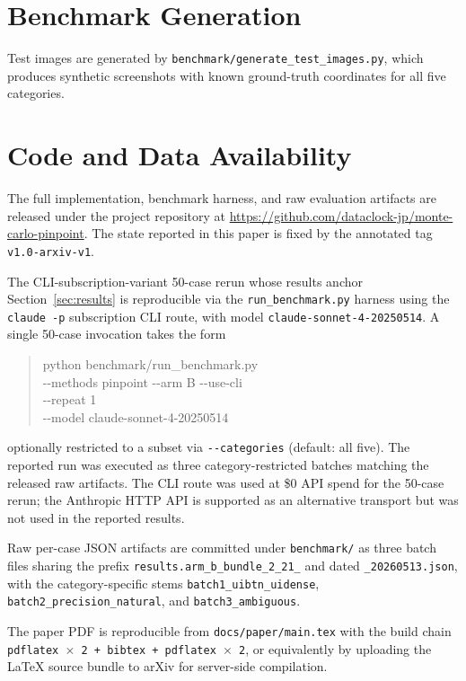 \documentclass[sigconf,nonacm]{acmart}
\begin{document}
\section{Benchmark Generation}

{\sloppy
Test images are generated by
\texttt{benchmark/generate\_test\_images.py},
which produces synthetic screenshots with known ground-truth coordinates
for all five categories.\par}

\section{Code and Data Availability}

{\sloppy
The full implementation, benchmark harness, and raw evaluation
artifacts are released under the project repository at
\url{https://github.com/dataclock-jp/monte-carlo-pinpoint}.  The
state reported in this paper is fixed by the annotated tag
\texttt{v1.0-arxiv-v1}.\par}

The CLI-subscription-variant 50-case rerun whose results anchor
Section~\ref{sec:results} is reproducible via the
\texttt{run\_benchmark.py} harness using the
\texttt{claude -p} subscription CLI route, with model
\texttt{claude-sonnet-4-20250514}.  A single 50-case invocation
takes the form
\begin{quote}\small\ttfamily
python benchmark/run\_benchmark.py\\
\hspace*{2em}-{}-methods pinpoint -{}-arm B -{}-use-cli\\
\hspace*{2em}-{}-repeat 1\\
\hspace*{2em}-{}-model claude-sonnet-4-20250514
\end{quote}
optionally restricted to a subset via
\texttt{-{}-categories} (default: all five).  The reported run
was executed as three category-restricted batches matching the
released raw artifacts.  The CLI route was used at \$0 API spend
for the 50-case rerun; the Anthropic HTTP API is supported as an
alternative transport but was not used in the reported results.

{\sloppy
Raw per-case JSON artifacts are committed under
\texttt{benchmark/} as three batch files sharing the prefix
\texttt{results.arm\_b\_bundle\_2\_21\_} and dated
\texttt{\_20260513.json}, with the category-specific stems
\texttt{batch1\_uibtn\_uidense},
\texttt{batch2\_precision\_natural}, and
\texttt{batch3\_ambiguous}.\par}
The paper PDF is reproducible from \texttt{docs/paper/main.tex}
with the build chain
\texttt{pdflatex $\times$ 2 + bibtex + pdflatex $\times$ 2}, or
equivalently by uploading the LaTeX source bundle to arXiv for
server-side compilation.
\end{document}
